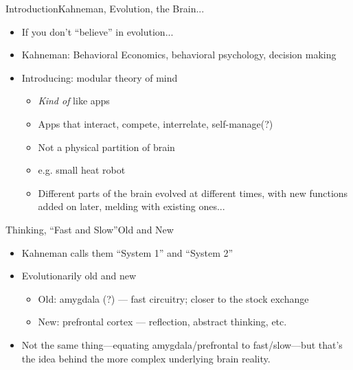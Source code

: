 \documentclass{beamer}
\begin{document}
\begin{frame}{Introduction}{Kahneman, Evolution, the Brain...}

  \begin{itemize}
  \addtolength{\itemsep}{0.5\baselineskip}
  \item If you don't ``believe'' in evolution...
  \item Kahneman: Behavioral Economics, behavioral psychology, decision making
  \item Introducing: modular theory of mind
    \begin{itemize}
    \addtolength{\itemsep}{0.5\baselineskip}
    \item {\it Kind of} like apps
    \item Apps that interact, compete, interrelate, self-manage(?)
    \item Not a physical partition of brain
    \item e.g. small heat robot
    \item Different parts of the brain evolved at different times, with new functions added on later, melding with existing ones...
    \end{itemize}
  \end{itemize}
\end{frame}
% 
\begin{frame}{Thinking, ``Fast and Slow''}{Old and New}
\begin{itemize}
\addtolength{\itemsep}{0.5\baselineskip}
\item Kahneman calls them ``System 1'' and ``System 2''
\item Evolutionarily old and new
    \begin{itemize}
    \addtolength{\itemsep}{0.5\baselineskip}
    \item Old: amygdala (?) --- fast circuitry; closer to the stock exchange
    \item New: prefrontal cortex --- reflection, abstract thinking, etc.
    \end{itemize}
\item Not the same thing---equating amygdala/prefrontal to fast/slow---but that's the idea behind the more complex underlying brain reality.
\end{itemize}
\end{frame}
\end{document}

